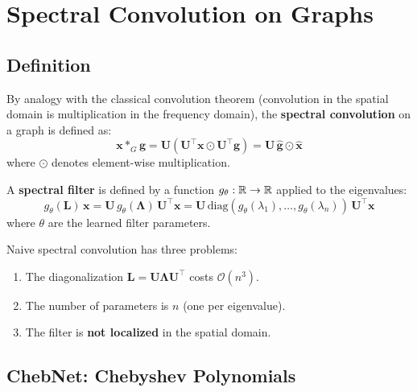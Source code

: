 \section{Spectral Convolution on Graphs}

\subsection{Definition}

\begin{definition}
By analogy with the classical convolution theorem (convolution in the spatial
domain is multiplication in the frequency domain), the \textbf{spectral
convolution} on a graph is defined as:
\[
    \mathbf{x} *_G \mathbf{g} = \mathbf{U}\!\left(\mathbf{U}^\top \mathbf{x}
    \odot \mathbf{U}^\top \mathbf{g}\right)
    = \mathbf{U}\, \hat{\mathbf{g}} \odot \hat{\mathbf{x}}
\]
where $\odot$ denotes element-wise multiplication.
\end{definition}

\begin{definition}
A \textbf{spectral filter} is defined by a function
$g_\theta: \mathbb{R} \to \mathbb{R}$ applied to the eigenvalues:
\[
    g_\theta(\mathbf{L})\, \mathbf{x} = \mathbf{U}\, g_\theta(\boldsymbol{\Lambda})\,
    \mathbf{U}^\top \mathbf{x}
    = \mathbf{U}\, \mathrm{diag}(g_\theta(\lambda_1), \ldots, g_\theta(\lambda_n))\,
    \mathbf{U}^\top \mathbf{x}
\]
where $\theta$ are the learned filter parameters.
\end{definition}

\begin{warning}[title=\textbf{Computational cost}]
Naive spectral convolution has three problems:
\begin{enumerate}
    \item The diagonalization $\mathbf{L} = \mathbf{U}\boldsymbol{\Lambda}\mathbf{U}^\top$
          costs $\mathcal{O}(n^3)$.
    \item The number of parameters is $n$ (one per eigenvalue).
    \item The filter is \textbf{not localized} in the spatial domain.
\end{enumerate}
\end{warning}

\subsection{ChebNet: Chebyshev Polynomials}

